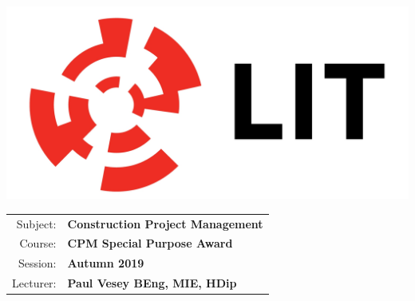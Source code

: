 \documentclass[a4paper, 10pt]{article}
\begin{document}
\lstset{language=HTML,
				basicstyle=\small,
				breaklines=true,
        numbers=left,
        numberstyle=\tiny,
        showstringspaces=false,
        aboveskip=-20pt,
        frame=leftline
        }
				
\begin{table}%
	\begin{minipage}{0.4\textwidth}%
			\includegraphics[width=1\textwidth]{img/LITlogo.jpg}
	\end{minipage}
	\qquad
	\centering
	\parbox{0.4\textwidth}{
		\begin{large}			
			\begin{tabular}{| r | l |} \hline
				Subject: & \textbf{Construction Project Management}\\
				Course: & \textbf{CPM Special Purpose Award}\\	
				Session: & \textbf{Autumn 2019}\\
				Lecturer: & \textbf{Paul Vesey \footnotesize{BEng, MIE, HDip}}\\
				\hline
			\end{tabular}
		\end{large}			
	}
\end{table}
\vspace{0.25cm}	
\end{document}
